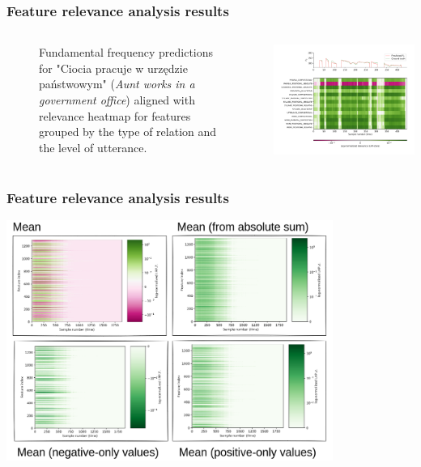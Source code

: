 \documentclass[a4paper,9pt]{beamer}
\theoremstyle{mytheoremstyle}
\begin{document}
\begin{frame}
\frametitle{Feature relevance analysis results}
\begin{columns}
\begin{figure}
	\caption{Fundamental frequency predictions for "Ciocia pracuje w urz\k{e}dzie pa\'nstwowym" (\textit{Aunt works in a government office}) aligned with relevance heatmap for features grouped by the type of relation and the level of utterance.}
\end{figure}
\begin{center}
  \includegraphics[width=\textwidth]{res/linguistic_levels_and_relation_types_amu_pl_ilo_baza_2006a_zbitki_a0139}
\end{center}
\end{columns}
\end{frame}


\begin{frame}
\frametitle{Feature relevance analysis results}
\begin{center}
  \includegraphics[width=0.8\textwidth]{res/cumulative_relevance.png}
\end{center}
\end{frame}
\end{document}
